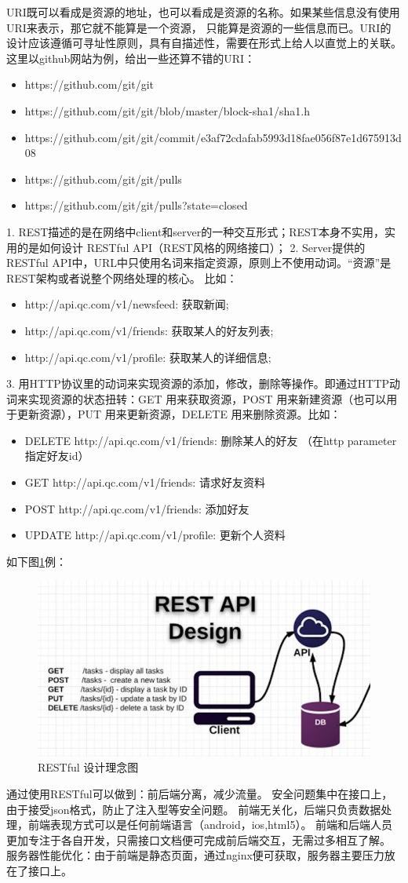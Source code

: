 URI既可以看成是资源的地址，也可以看成是资源的名称。如果某些信息没有使用URI来表示，那它就不能算是一个资源， 只能算是资源的一些信息而已。URI的设计应该遵循可寻址性原则，具有自描述性，需要在形式上给人以直觉上的关联。这里以github网站为例，给出一些还算不错的URI：
\begin{itemize}
	\item https://github.com/git/git
	\item https://github.com/git/git/blob/master/block-sha1/sha1.h
	\item https://github.com/git/git/commit/e3af72cdafab5993d18fae056f87e1d675913d08
	\item https://github.com/git/git/pulls
	\item https://github.com/git/git/pulls?state=closed
\end{itemize}

1. REST描述的是在网络中client和server的一种交互形式；REST本身不实用，实用的是如何设计 RESTful API（REST风格的网络接口）；
2. Server提供的RESTful API中，URL中只使用名词来指定资源，原则上不使用动词。“资源”是REST架构或者说整个网络处理的核心。
比如：
\begin{itemize}
	\item http://api.qc.com/v1/newsfeed: 获取新闻; 
	\item http://api.qc.com/v1/friends: 获取某人的好友列表;
	\item http://api.qc.com/v1/profile: 获取某人的详细信息;
\end{itemize}

3. 用HTTP协议里的动词来实现资源的添加，修改，删除等操作。即通过HTTP动词来实现资源的状态扭转：GET 用来获取资源，POST 用来新建资源（也可以用于更新资源），PUT 用来更新资源，DELETE 用来删除资源。比如：
\begin{itemize}
	\item DELETE http://api.qc.com/v1/friends: 删除某人的好友 （在http parameter指定好友id）
	\item GET  http://api.qc.com/v1/friends: 请求好友资料
	\item POST http://api.qc.com/v1/friends: 添加好友
	\item UPDATE http://api.qc.com/v1/profile: 更新个人资料
\end{itemize}

如下图\ref{fig:3-2}例：
\begin{figure}[H]
	\centering
	\includegraphics[width=0.85\linewidth]{figure/3-2}
	\caption{RESTful 设计理念图}
	\label{fig:3-2}
\end{figure}

通过使用RESTful可以做到：前后端分离，减少流量。
安全问题集中在接口上，由于接受json格式，防止了注入型等安全问题。
前端无关化，后端只负责数据处理，前端表现方式可以是任何前端语言（android，ios,html5）。
前端和后端人员更加专注于各自开发，只需接口文档便可完成前后端交互，无需过多相互了解。
服务器性能优化：由于前端是静态页面，通过nginx便可获取，服务器主要压力放在了接口上。
